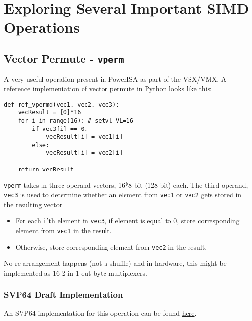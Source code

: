 %
\section{Exploring Several Important \acrshort{SIMD} Operations}
\subsection{Vector Permute - \texttt{vperm}}

A very useful operation present in PowerISA as part of the
\acrshort{VSX}/\acrshort{VMX}.
A reference implementation of vector permute in Python looks like this:

\begin{verbatim}
def ref_vpermd(vec1, vec2, vec3):
    vecResult = [0]*16
    for i in range(16): # setvl VL=16
        if vec3[i] == 0:
            vecResult[i] = vec1[i]
        else:
            vecResult[i] = vec2[i]

    return vecResult
\end{verbatim}

\texttt{vperm} takes in three operand vectors, 16*8-bit (128-bit) each.
The third operand, \texttt{vec3} is used to determine whether an element from
\texttt{vec1} or \texttt{vec2} gets stored in the resulting vector.

\begin{itemize}
  \item For each \texttt{i}'th element in \texttt{vec3}, if element is
        equal to 0, store corresponding element from \texttt{vec1} in the result.
  \item Otherwise, store corresponding element from \texttt{vec2} in the result.
\end{itemize}

No re-arrangement happens (not a shuffle) and in hardware, this might be
implemented as 16 2-in 1-out byte multiplexers.

\subsubsection{\acrshort{SVP64} Draft Implementation}

An \acrshort{SVP64} implementation for this operation can be found
\href{https://github.com/ngisearchsvp64/glibc-svp64/blob/master/svp64-port/svp64/vperm_svp64.s}{here}.

